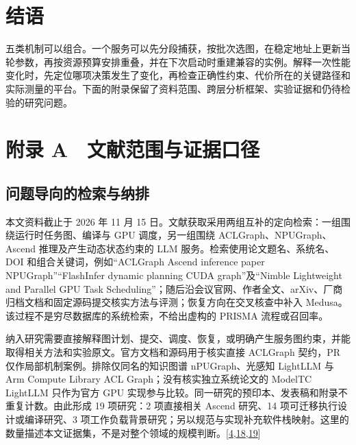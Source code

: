 \documentclass[
  UTF8,
  zihao=5]{ctexart}
\begin{document}
\hypertarget{ux7ed3ux8bed}{%
\section*{结语}\label{ux7ed3ux8bed}}

五类机制可以组合。一个服务可以先分段捕获，按批次选图，在稳定地址上更新当轮参数，再按资源预算安排重叠，并在下次启动时重建兼容的实例。解释一次性能变化时，先定位哪项决策发生了变化，再检查正确性约束、代价所在的关键路径和实际测量的平台。下面的附录保留了资料范围、跨层分析框架、实验证据和仍待检验的研究问题。

\hypertarget{ux9644ux5f55-a-ux6587ux732eux8303ux56f4ux4e0eux8bc1ux636eux53e3ux5f84}{%
\section*{附录
A　文献范围与证据口径}\label{ux9644ux5f55-a-ux6587ux732eux8303ux56f4ux4e0eux8bc1ux636eux53e3ux5f84}}

\hypertarget{ux95eeux9898ux5bfcux5411ux7684ux68c0ux7d22ux4e0eux7eb3ux6392}{%
\subsection*{问题导向的检索与纳排}\label{ux95eeux9898ux5bfcux5411ux7684ux68c0ux7d22ux4e0eux7eb3ux6392}}

本文资料截止于 2026 年 11 月 15
日。文献获取采用两组互补的定向检索：一组围绕运行时任务图、编译与 GPU
调度，另一组围绕 ACLGraph、NPUGraph、Ascend 推理及产生动态状态约束的 LLM
服务。检索使用论文题名、系统名、DOI 和组合关键词，例如``ACLGraph Ascend
inference paper NPUGraph''``FlashInfer dynamic planning CUDA
graph''及``Nimble Lightweight and Parallel GPU Task
Scheduling''；随后沿会议官网、作者全文、arXiv、厂商归档文档和固定源码提交核实方法与评测；恢复方向在交叉核查中补入
Medusa。该过程不是穷尽数据库的系统检索，不给出虚构的 PRISMA
流程或召回率。

纳入研究需要直接解释图计划、提交、调度、恢复，或明确产生服务图约束，并能取得相关方法和实验原文。官方文档和源码用于核实直接
ACLGraph 契约，PR 仅作局部机制案例。排除仅同名的知识图谱
nPUGraph、光感知 LightLLM 与 Arm Compute Library ACL
Graph；没有核实独立系统论文的 ModelTC LightLLM 只作为官方 GPU
实现参与比较。同一研究的预印本、发表稿和附录不重复计数。由此形成 19
项研究：2 项直接相关 Ascend 研究、14 项可迁移执行设计或编译研究、3
项工作负载背景研究；另以规范与实现补充软件栈映射。这里的数量描述本文证据集，不是对整个领域的规模判断。{[}\protect\hyperlink{ref-liu2025xllm}{4},\protect\hyperlink{ref-yu2026ascendfield}{18},\protect\hyperlink{ref-lightllm2026code}{19}{]}
\end{document}
